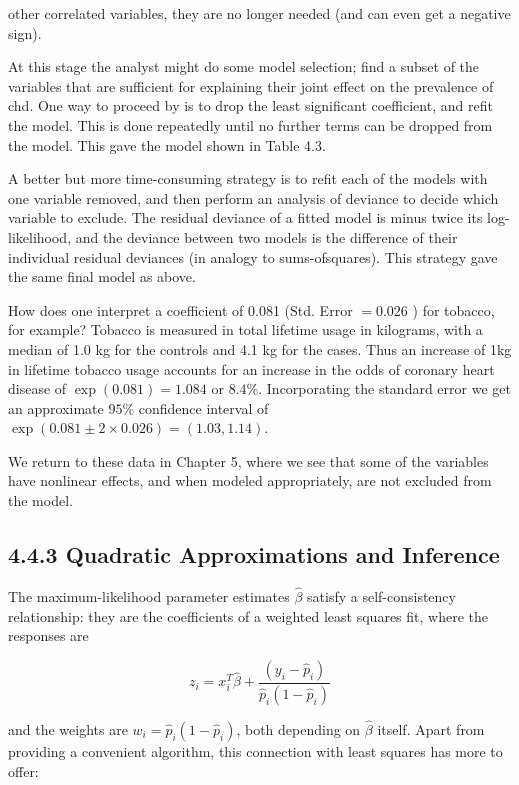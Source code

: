 \documentclass[10pt]{article}
\begin{document}
other correlated variables, they are no longer needed (and can even get a negative sign).

At this stage the analyst might do some model selection; find a subset of the variables that are sufficient for explaining their joint effect on the prevalence of chd. One way to proceed by is to drop the least significant coefficient, and refit the model. This is done repeatedly until no further terms can be dropped from the model. This gave the model shown in Table 4.3.

A better but more time-consuming strategy is to refit each of the models with one variable removed, and then perform an analysis of deviance to decide which variable to exclude. The residual deviance of a fitted model is minus twice its log-likelihood, and the deviance between two models is the difference of their individual residual deviances (in analogy to sums-ofsquares). This strategy gave the same final model as above.

How does one interpret a coefficient of 0.081 (Std. Error $=0.026$ ) for tobacco, for example? Tobacco is measured in total lifetime usage in kilograms, with a median of 1.0 kg for the controls and 4.1 kg for the cases. Thus an increase of 1kg in lifetime tobacco usage accounts for an increase in the odds of coronary heart disease of $\exp (0.081)=1.084$ or $8.4 \%$. Incorporating the standard error we get an approximate $95 \%$ confidence interval of $\exp (0.081 \pm 2 \times 0.026)=(1.03,1.14)$.

We return to these data in Chapter 5, where we see that some of the variables have nonlinear effects, and when modeled appropriately, are not excluded from the model.

\subsection*{4.4.3 Quadratic Approximations and Inference}
The maximum-likelihood parameter estimates $\hat{\beta}$ satisfy a self-consistency relationship: they are the coefficients of a weighted least squares fit, where the responses are


\begin{equation*}
z_{i}=x_{i}^{T} \hat{\beta}+\frac{\left(y_{i}-\hat{p}_{i}\right)}{\hat{p}_{i}\left(1-\hat{p}_{i}\right)} \tag{4.29}
\end{equation*}


and the weights are $w_{i}=\hat{p}_{i}\left(1-\hat{p}_{i}\right)$, both depending on $\hat{\beta}$ itself. Apart from providing a convenient algorithm, this connection with least squares has more to offer:
\end{document}
